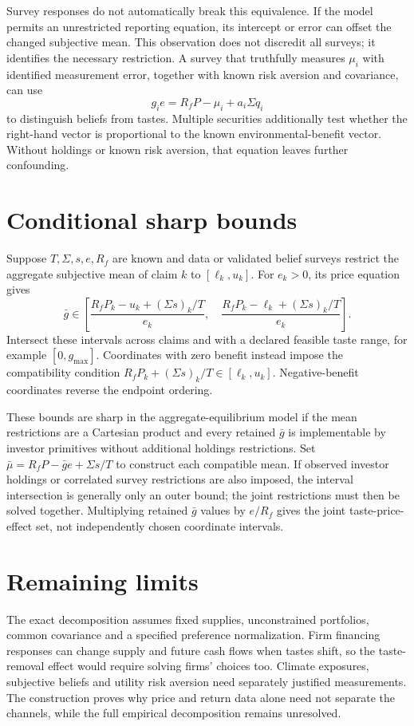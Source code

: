 \documentclass[11pt]{article}
\begin{document}
Survey responses do not automatically break this equivalence. If the model permits an unrestricted reporting equation, its intercept or error can offset the changed subjective mean. This observation does not discredit all surveys; it identifies the necessary restriction. A survey that truthfully measures $\mu_i$ with identified measurement error, together with known risk aversion and covariance, can use
\[
              g_i e=R_fP-\mu_i+a_i\Sigma q_i
\]
to distinguish beliefs from tastes. Multiple securities additionally test whether the right-hand vector is proportional to the known environmental-benefit vector. Without holdings or known risk aversion, that equation leaves further confounding.

\section*{Conditional sharp bounds}
Suppose $T,\Sigma,s,e,R_f$ are known and data or validated belief surveys restrict the aggregate subjective mean of claim $k$ to $[\ell_k,u_k]$. For $e_k>0$, its price equation gives
\[
 \bar g\in\left[
 \frac{R_fP_k-u_k+(\Sigma s)_k/T}{e_k},\quad
 \frac{R_fP_k-\ell_k+(\Sigma s)_k/T}{e_k}\right].
\]
Intersect these intervals across claims and with a declared feasible taste range, for example $[0,g_{\max}]$. Coordinates with zero benefit instead impose the compatibility condition $R_fP_k+(\Sigma s)_k/T\in[\ell_k,u_k]$. Negative-benefit coordinates reverse the endpoint ordering.

These bounds are sharp in the aggregate-equilibrium model if the mean restrictions are a Cartesian product and every retained $\bar g$ is implementable by investor primitives without additional holdings restrictions. Set $\bar\mu=R_fP-\bar g e+\Sigma s/T$ to construct each compatible mean. If observed investor holdings or correlated survey restrictions are also imposed, the interval intersection is generally only an outer bound; the joint restrictions must then be solved together. Multiplying retained $\bar g$ values by $e/R_f$ gives the joint taste-price-effect set, not independently chosen coordinate intervals.

\section*{Remaining limits}
The exact decomposition assumes fixed supplies, unconstrained portfolios, common covariance and a specified preference normalization. Firm financing responses can change supply and future cash flows when tastes shift, so the taste-removal effect would require solving firms' choices too. Climate exposures, subjective beliefs and utility risk aversion need separately justified measurements. The construction proves why price and return data alone need not separate the channels, while the full empirical decomposition remains unresolved.
\end{document}
